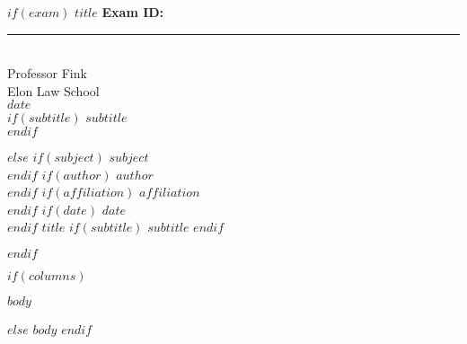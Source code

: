 \documentclass[
$if(fontsize)$
  $fontsize$,
$else$
  11pt,
$endif$
$if(papersize)$
  $papersize$paper,
$else$
  letterpaper,
$endif$
$if(oneside)$
  oneside,
$else$
  twoside,
$endif$
]{article}
\begin{document}
\thispagestyle{empty}
\singlespacing

\begin{flushleft}

$if(exam)$
\rmfamily\normalsize{$title$} \hfill\normalsize{\rmfamily\bfseries{Exam ID: }}\rule{3cm}{0.4pt}\\
\rmfamily\normalsize{Professor Fink} \\
\rmfamily\normalsize{Elon Law School}\\
\rmfamily\normalsize{$date$}\\
$if(subtitle)$
\vspace{.6cm}
\titlefont\large{$subtitle$} \\
\vspace{-.6cm}
$endif$

$else$
$if(subject)$
\rmfamily\footnotesize{$subject$} \\
$endif$
$if(author)$
\rmfamily\footnotesize{$author$} \\
$endif$
$if(affiliation)$
\rmfamily\footnotesize{$affiliation$}  \\
$endif$
$if(date)$
\rmfamily\footnotesize{$date$} \\
$endif$
\vspace{5mm}
\titlefont\LARGE{$title$} 
$if(subtitle)$
\titlefont\Large{$subtitle$} 
$endif$

$endif$

\end{flushleft}

$if(columns)$
\setlength{\columnsep}{5em}
\begin{multicols*}{2}
$body$
\end{multicols*}

$else$
$body$
$endif$
\end{document}
